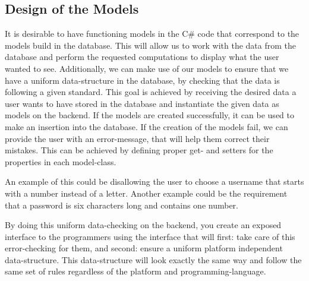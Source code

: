 \subsection{Design of the Models}\label{subsec:designmodels}
It is desirable to have functioning models in the C\# code that correspond to the models build in the database. This will allow us to work with the data from the database and perform the requested computations to display what the user wanted to see. Additionally, we can make use of our models to ensure that we have a uniform data-structure in the database, by checking that the data is following a given standard. This goal is achieved by receiving the desired data a user wants to have stored in the database and instantiate the given data as models on the backend. If the models are created successfully, it can be used to make an insertion into the database. If the creation of the models fail, we can provide the user with an error-message, that will help them correct their mistakes. This can be achieved by defining proper get- and setters for the properties in each model-class. 

An example of this could be disallowing the user to choose a username that starts with a number instead of a letter. Another example could be the requirement that a password is six characters long and contains one number.

By doing this uniform data-checking on the backend, you create an exposed interface to the programmers using the interface that will first: take care of this error-checking for them, and second: ensure a uniform platform independent data-structure. This data-structure will look exactly the same way and follow the same set of rules regardless of the platform and programming-language. 